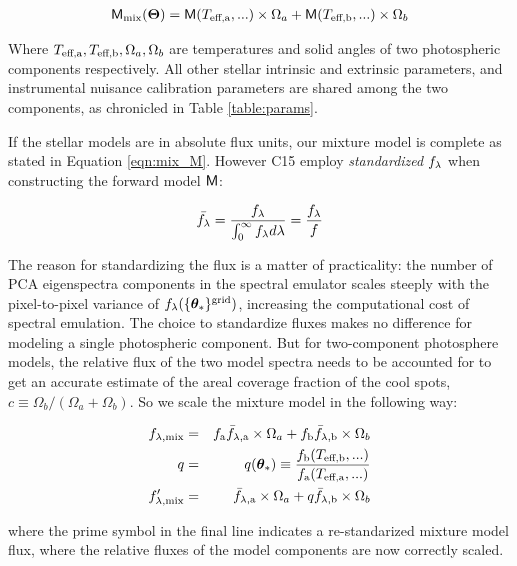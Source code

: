 \documentclass[twocolumn]{emulateapj}%
\newcommand{\iancze}{{\sc C15 }}
\begin{document}
\begin{eqnarray} \label{eqn:mix_M}
\mathsf{M}_{\mathrm{mix}}({\bm \Theta}) = \mathsf{M}(T_\textrm{eff,a}, ...) \times \Omega_a + \mathsf{M}(T_\textrm{eff,b}, ...) \times \Omega_b
\end{eqnarray}


Where $T_\textrm{eff,a}, T_\textrm{eff,b}, \Omega_a, \Omega_b$ are temperatures and solid angles of two photospheric components respectively.  All other stellar intrinsic and extrinsic parameters, and instrumental nuisance calibration parameters are shared among the two components, as chronicled in Table \ref{table:params}.

If the stellar models are in absolute flux units, our mixture model is complete as stated in Equation \ref{eqn:mix_M}.  However \iancze employ \emph{standardized} $f_\lambda$ when constructing the forward model $\mathsf{M}$:


\begin{eqnarray} \label{eqn:normalization}
\bar {f_\lambda} = \frac{f_\lambda}{\int_{0}^{\infty} f_\lambda d\lambda} = \frac{f_\lambda}{f}
\end{eqnarray}

The reason for standardizing the flux is a matter of practicality: the number of PCA eigenspectra components in the spectral emulator scales steeply with the pixel-to-pixel variance of $f_{\lambda}(\{{\bm \theta}_{\ast}\}^\textrm{grid})$, increasing the computational cost of spectral emulation.  The choice to standardize fluxes makes no difference for modeling a single photospheric component.  But for two-component photosphere models, the relative flux of the two model spectra needs to be accounted for to get an accurate estimate of the areal coverage fraction of the cool spots, $c \equiv \Omega_b/(\Omega_a+\Omega_b)$.  So we scale the mixture model in the following way:

\begin{eqnarray} \label{eqn:norm_scaling}
f_{\lambda, \mathrm{mix}} &=& f_{\mathrm{a}} \bar f_{\lambda, \mathrm{a}} \times \Omega_a + f_{\mathrm{b}} \bar f_{\lambda, \mathrm{b}} \times \Omega_b \\
q &=& q({\bm \theta}_{\ast})\equiv \frac{f_{\mathrm{b}}(T_\textrm{eff,b}, ...)}{f_{\mathrm{a}}(T_\textrm{eff,a}, ...)} \\
f_{\lambda, \mathrm{mix}}^{\prime} &=& \bar f_{\lambda, \mathrm{a}} \times \Omega_a + q \bar f_{\lambda, \mathrm{b}} \times \Omega_b
\end{eqnarray}

where the prime symbol in the final line indicates a re-standarized mixture model flux, where the relative fluxes of the model components are now correctly scaled.
\end{document}
